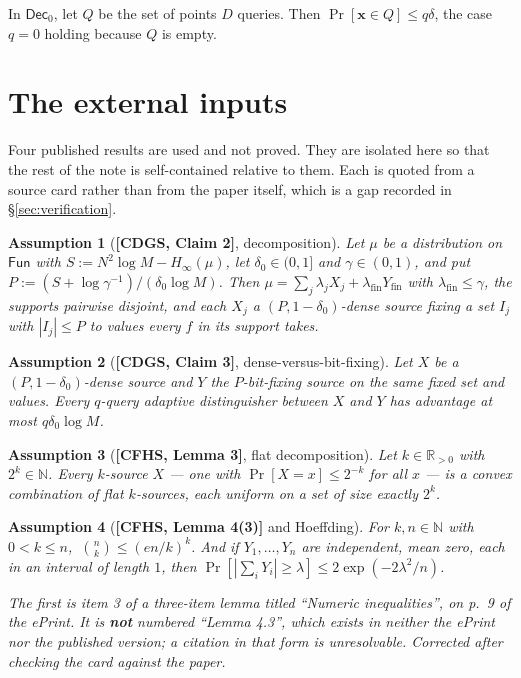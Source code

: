 \documentclass{aicr-solution}
\newcommand{\Fun}{\mathsf{Fun}}
\newcommand{\Dec}{\mathsf{Dec}}
\newcommand{\Prob}[1]{\Pr\!\left[#1\right]}
\newcommand{\vx}{\mathbf{x}}
\newcommand{\Ass}[1]{\textbf{[#1]}}
\newtheorem*{assumption}{Assumption}
\begin{document}
\begin{lemma}\label{lem:query}
In $\Dec_0$, let $Q$ be the set of points $D$ queries. Then
$\Prob{\vx \in Q} \le q\delta$, the case $q = 0$ holding because $Q$ is empty.
\end{lemma}

\section{The external inputs}\label{sec:external}

Four published results are used and not proved. They are isolated here so that
the rest of the note is self-contained relative to them. Each is quoted from a
source card rather than from the paper itself, which is a gap recorded in
\S\ref{sec:verification}.

\begin{assumption}[\Ass{CDGS, Claim 2}, decomposition]\label{ass:cdgs2}
Let $\mu$ be a distribution on $\Fun$ with $S := N^{2}\log M - H_\infty(\mu)$, let
$\delta_0 \in (0,1]$ and $\gamma \in (0,1)$, and put
$P := (S + \log \gamma^{-1})/(\delta_0 \log M)$. Then
$\mu = \sum_j \lambda_j X_j + \lambda_{\mathrm{fin}} Y_{\mathrm{fin}}$ with
$\lambda_{\mathrm{fin}} \le \gamma$, the supports pairwise disjoint, and each $X_j$
a $(P, 1-\delta_0)$-dense source fixing a set $I_j$ with $|I_j| \le P$ to values
every $f$ in its support takes.
\end{assumption}

\begin{assumption}[\Ass{CDGS, Claim 3}, dense-versus-bit-fixing]\label{ass:cdgs3}
Let $X$ be a $(P,1-\delta_0)$-dense source and $Y$ the $P$-bit-fixing source on the
same fixed set and values. Every $q$-query adaptive distinguisher between $X$ and
$Y$ has advantage at most $q\delta_0 \log M$.
\end{assumption}

\begin{assumption}[\Ass{CFHS, Lemma 3}, flat decomposition]\label{ass:flat}
Let $k \in \mathbb{R}_{>0}$ with $2^{k} \in \mathbb{N}$. Every $k$-source $X$ ---
one with $\Prob{X = x} \le 2^{-k}$ for all $x$ --- is a convex combination of flat
$k$-sources, each uniform on a set of size exactly $2^{k}$.
\end{assumption}

\begin{assumption}[\Ass{CFHS, Lemma 4(3)} and Hoeffding]\label{ass:binom}
For $k,n \in \mathbb{N}$ with $0 < k \le n$, $\ \binom{n}{k} \le (en/k)^{k}$. And
if $Y_1,\dots,Y_n$ are independent, mean zero, each in an interval of length $1$,
then $\Prob{|\sum_i Y_i| \ge \lambda} \le 2\exp(-2\lambda^{2}/n)$.

The first is \emph{item 3} of a three-item lemma titled ``Numeric inequalities'', on p.~9 of the
ePrint. It is \textbf{not} numbered ``Lemma 4.3'', which exists in neither the ePrint nor the
published version; a citation in that form is unresolvable. Corrected after checking the card
against the paper.
\end{assumption}
\end{document}
